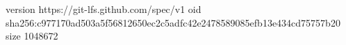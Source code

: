 version https://git-lfs.github.com/spec/v1
oid sha256:c977170ad503a5f56812650ec2c5adfc42e2478589085efb13e434cd75757b20
size 1048672
